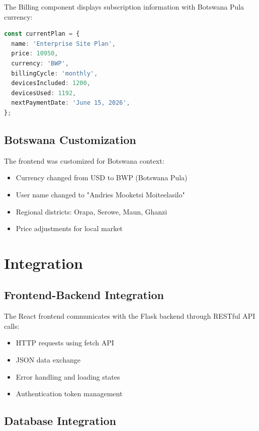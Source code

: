 The Billing component displays subscription information with Botswana Pula currency:

\begin{lstlisting}[language=TypeScript, caption=Botswana Currency Implementation]
const currentPlan = {
  name: 'Enterprise Site Plan',
  price: 10950,
  currency: 'BWP',
  billingCycle: 'monthly',
  devicesIncluded: 1200,
  devicesUsed: 1192,
  nextPaymentDate: 'June 15, 2026',
};
\end{lstlisting}

\subsection{Botswana Customization}

The frontend was customized for Botswana context:

\begin{itemize}
    \item Currency changed from USD to BWP (Botswana Pula)
    \item User name changed to "Andries Mooketsi Moiteelasilo"
    \item Regional districts: Orapa, Serowe, Maun, Ghanzi
    \item Price adjustments for local market
\end{itemize}

\section{Integration}

\subsection{Frontend-Backend Integration}

The React frontend communicates with the Flask backend through RESTful API calls:

\begin{itemize}
    \item HTTP requests using fetch API
    \item JSON data exchange
    \item Error handling and loading states
    \item Authentication token management
\end{itemize}

\subsection{Database Integration}

